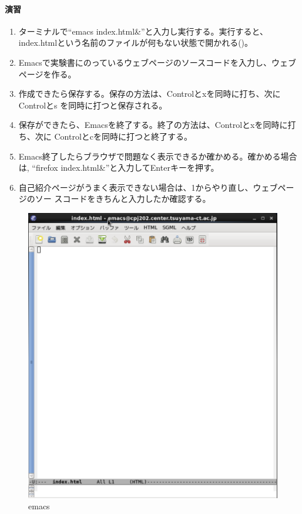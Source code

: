 \paragraph{演習}
\begin{enumerate}
\item ターミナルで``emacs index.html\&''と入力し実行する。実行すると、
      index.htmlという名前のファイルが何もない状態で開かれる()。
\item Emacsで実験書にのっているウェブページのソースコードを入力し、ウェブページを作る。
\item 作成できたら保存する。保存の方法は、Controlとxを同時に打ち、次にControlとs
      を同時に打つと保存される。
\item 保存ができたら、Emacsを終了する。終了の方法は、Controlとxを同時に打ち、次に
      Controlとcを同時に打つと終了する。
\item Emacs終了したらブラウザで問題なく表示できるか確かめる。確かめる場合は,
      ``firefox index.html\&''と入力してEnterキーを押す。
\item 自己紹介ページがうまく表示できない場合は、1からやり直し、ウェブページのソー
      スコードをきちんと入力したか確認する。
\end{enumerate}

\begin{figure}[htbp]
\begin{center}
\includegraphics[width=0.5\linewidth]{emacs.eps}
\caption{emacs}
\label{fig:emacs}
\end{center}
\end{figure}

